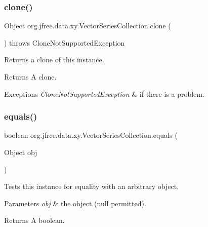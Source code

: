 \subsubsection{\texorpdfstring{clone()}{clone()}}
{\footnotesize\ttfamily Object org.\+jfree.\+data.\+xy.\+Vector\+Series\+Collection.\+clone (\begin{DoxyParamCaption}{ }\end{DoxyParamCaption}) throws Clone\+Not\+Supported\+Exception}

Returns a clone of this instance.

\begin{DoxyReturn}{Returns}
A clone.
\end{DoxyReturn}

\begin{DoxyExceptions}{Exceptions}
{\em Clone\+Not\+Supported\+Exception} & if there is a problem. \\
\hline
\end{DoxyExceptions}
\mbox{\label{classorg_1_1jfree_1_1data_1_1xy_1_1_vector_series_collection_a18831d0feec3be9925da5d17c3a9b829}} 
\subsubsection{\texorpdfstring{equals()}{equals()}}
{\footnotesize\ttfamily boolean org.\+jfree.\+data.\+xy.\+Vector\+Series\+Collection.\+equals (\begin{DoxyParamCaption}\item[{Object}]{obj }\end{DoxyParamCaption})}

Tests this instance for equality with an arbitrary object.


\begin{DoxyParams}{Parameters}
{\em obj} & the object ({\ttfamily null} permitted).\\
\hline
\end{DoxyParams}
\begin{DoxyReturn}{Returns}
A boolean. 
\end{DoxyReturn}
\mbox{\label{classorg_1_1jfree_1_1data_1_1xy_1_1_vector_series_collection_a69a6b517673d0152e060d616742931cc}} 
